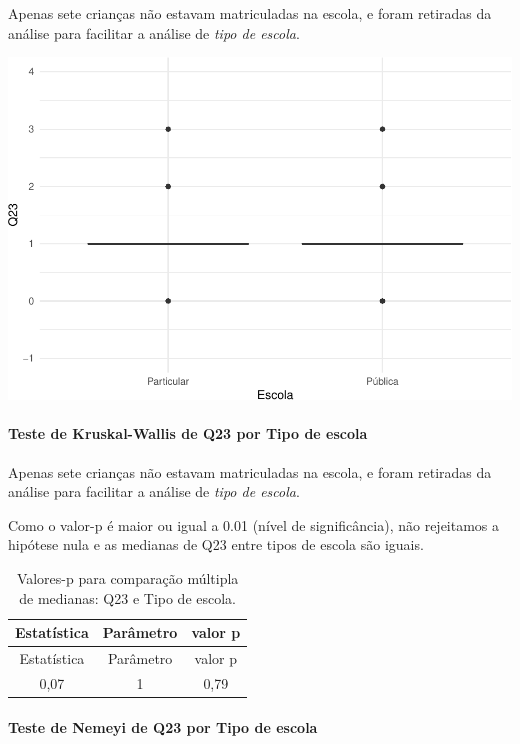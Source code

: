 \documentclass[]{article}
\let\oldparagraph\paragraph
\renewcommand{\paragraph}[1]{\oldparagraph{#1}\mbox{}}
\begin{document}
Apenas sete crianças não estavam matriculadas na escola, e foram retiradas da análise para facilitar a análise de \emph{tipo de escola}.

\begin{center}\includegraphics[width=0.75\linewidth]{relatorio_covid19_files/figure-latex/unnamed-chunk-588-1} \end{center}

\hypertarget{teste-de-kruskal-wallis-de-q23-por-tipo-de-escola}{%
\paragraph{Teste de Kruskal-Wallis de Q23 por Tipo de escola}\label{teste-de-kruskal-wallis-de-q23-por-tipo-de-escola}}

Apenas sete crianças não estavam matriculadas na escola, e foram retiradas da análise para facilitar a análise de \emph{tipo de escola}.

Como o valor-p é maior ou igual a 0.01 (nível de significância), não rejeitamos a hipótese nula e as medianas de Q23 entre tipos de escola são iguais.

\begin{longtable}[]{@{}ccc@{}}
\caption{\label{tab:unnamed-chunk-590}Valores-p para comparação múltipla de medianas: Q23 e Tipo de escola.}\tabularnewline
\toprule
Estatística & Parâmetro & valor p\tabularnewline
\midrule
\endfirsthead
\toprule
Estatística & Parâmetro & valor p\tabularnewline
\midrule
\endhead
0,07 & 1 & 0,79\tabularnewline
\bottomrule
\end{longtable}

\hypertarget{teste-de-nemeyi-de-q23-por-tipo-de-escola}{%
\paragraph{Teste de Nemeyi de Q23 por Tipo de escola}\label{teste-de-nemeyi-de-q23-por-tipo-de-escola}}
\end{document}
